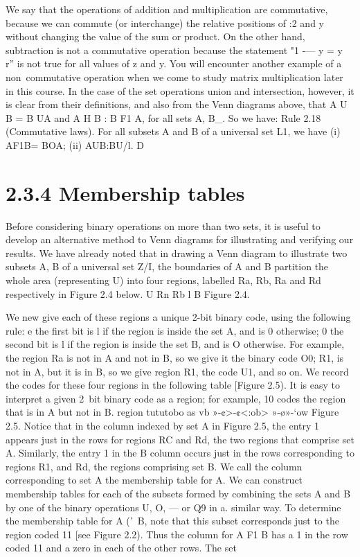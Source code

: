{%
We say that the operations of addition and multiplication are commutative, because we can
commute (or interchange) the relative positions of :2 and y without changing the value of the sum
or product. On the other hand, subtraction is not a commutative operation because the statement
"1 -— y = y ~ r” is not true for all values of z and y. You will encounter another example of a
non~commutative operation when we come to study matrix multiplication later in this course.
In the case of the set operations union and intersection, however, it is clear from their deﬁnitions,
and also from the Venn diagrams above, that A U B = B UA and A H B : B F1 A, for all sets A, B_.
So we have:
Rule 2.18 (Commutative laws). For all subsets A and B of a universal set L1, we have
(i) AF1B= BOA; (ii) AUB:BU/l. D
\section{2.3.4 Membership tables}
Before considering binary operations on more than two sets, it is useful to develop an alternative
method to Venn diagrams for illustrating and verifying our results.
We have already noted that in drawing a Venn diagram to illustrate two subsets A, B of a universal
set Z/I, the boundaries of A and B partition the whole area (representing U) into four regions,
labelled Ra, Rb, Ra and Rd respectively in Figure 2.4 below.
U
Rn
Rb
l B
Figure 2.4.


We new give each of these regions a unique 2-bit binary code, using the following rule:
e the ﬁrst bit is l if the region is inside the set A, and is 0 otherwise;
0 the second bit is l if the region is inside the set B, and is O otherwise.
For example, the region Ra is not in A and not in B, so we give it the binary code O0; R1, is not
in A, but it is in B, so we give region R1, the code U1, and so on. We record the codes for these
four regions in the following table [Figure 2.5). It is easy to interpret a given 2~bit binary code as
a region; for example, 10 codes the region that is in A but not in B.
region
tututobo
as vb
»-¢>-¢<:ob>
»-\o»-‘ow
Figure 2.5.
Notice that in the column indexed by set A in Figure 2.5, the entry 1 appears just in the rows for
regions RC and Rd, the two regions that comprise set A. Similarly, the entry 1 in the B column
occurs just in the rows corresponding to regions R1, and Rd, the regions comprising set B. We call
the column corresponding to set A the membership table for A.
We can construct membership tables for each of the subsets formed by combining the sets A and B
by one of the binary operations U, O, — or Q9 in a. similar way. To determine the membership table
for A ('\ B, note that this subset corresponds just to the region coded 11 [see Figure 2.2). Thus
the column for A F1 B has a 1 in the row coded 11 and a zero in each of the other rows. The set

}

